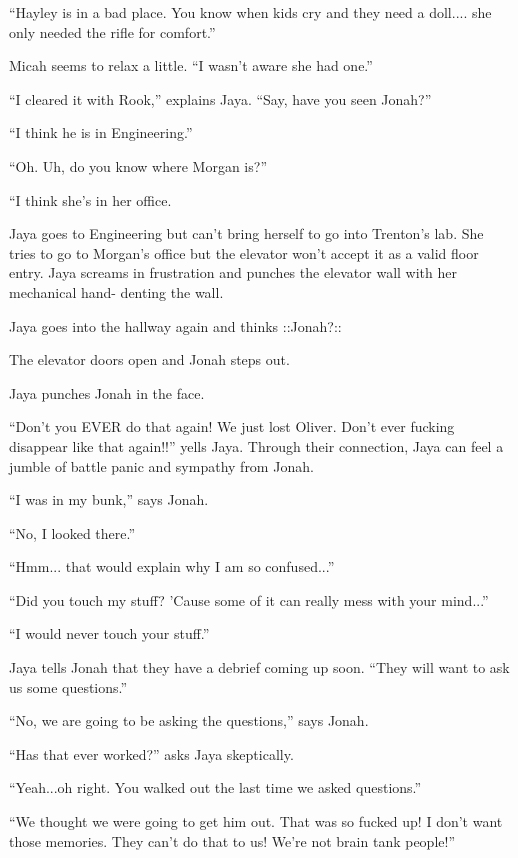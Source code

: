 ``Hayley is in a bad place.  You know when kids cry and they need a doll.... she only needed the rifle for comfort.''

Micah seems to relax a little. ``I wasn't aware she had one.''

``I cleared it with Rook,'' explains Jaya.  ``Say, have you seen Jonah?''

``I think he is in Engineering.''

``Oh.  Uh, do you know where Morgan is?''

``I think she's in her office.



Jaya goes to Engineering but can't bring herself to go into Trenton's lab.  She tries to go to Morgan's office but the elevator won't accept it as a valid floor entry.  Jaya screams in frustration and punches the elevator wall with her mechanical hand- denting the wall.





Jaya goes into the hallway again and thinks  {\color[RGB]{255,0,0}::Jonah?::} 

The elevator doors open and Jonah steps out.

Jaya punches Jonah in the face.

``Don't you EVER do that again!  We just lost Oliver.  Don't ever fucking disappear like that again!!'' yells Jaya.  Through their connection, Jaya can feel a jumble of battle panic and sympathy from Jonah.

``I was in my bunk,'' says Jonah.

``No, I looked there.''

``Hmm... that would explain why I am so confused...''

``Did you touch my stuff?  'Cause some of it can really mess with your mind...''

``I would never touch your stuff.''



Jaya tells Jonah that they have a debrief coming up soon.  ``They will want to ask us some questions.''

``No, we are going to be asking the questions,'' says Jonah.

``Has that ever worked?'' asks Jaya skeptically.

``Yeah...oh right.  You walked out the last time we asked questions.''

``We thought we were going to get him out.  That was so fucked up!  I don't want those memories.  They can't do that to us!  We're not brain tank people!''



